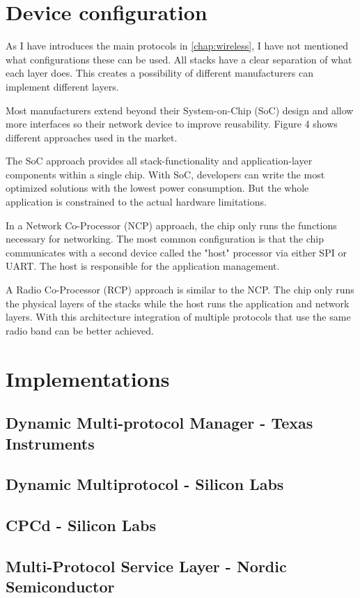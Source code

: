 \section{Device configuration}
\label{sec:multi:dc}
As I have introduces the main protocols in \autoref{chap:wireless}, I have not mentioned what configurations these can be used. All stacks have a clear separation of what each layer does. This creates a possibility of different manufacturers can implement different layers.

Most manufacturers extend beyond their System-on-Chip (SoC) design and allow more interfaces so their network device to improve reusability. Figure 4 shows different approaches used in the market.

The SoC approach provides all stack-functionality and application-layer components within a single chip. With SoC, developers can write the most optimized solutions with the lowest power consumption. But the whole application is constrained to the actual hardware limitations.

In a Network Co-Processor (NCP) approach, the chip only runs the functions necessary for networking. The most common configuration is that the chip communicates with a second device called the "host" processor via either SPI or UART. The host is responsible for the application management.
 
A Radio Co-Processor (RCP) approach is similar to the NCP. The chip only runs the physical layers of the stacks while the host runs the application and network layers. With this architecture integration of multiple protocols that use the same radio band can be better achieved.

\section{Implementations}
\label{sec:multi:imp}
\subsection{Dynamic Multi-protocol Manager - Texas Instruments}
\subsection{Dynamic Multiprotocol - Silicon Labs}
\subsection{CPCd - Silicon Labs}
\subsection{Multi-Protocol Service Layer - Nordic Semiconductor}